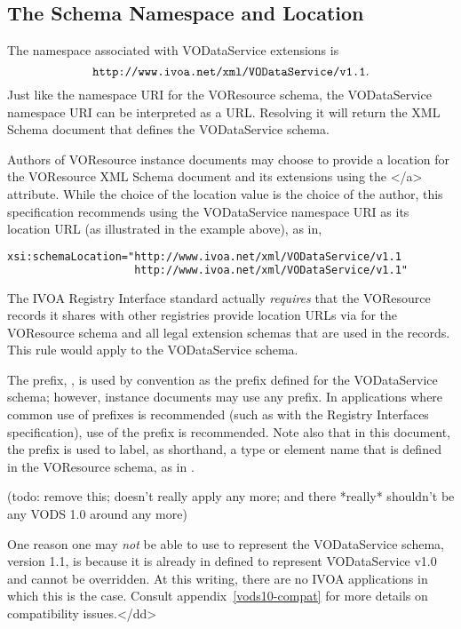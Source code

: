 \documentclass[11pt,a4paper]{ivoa}
\begin{document}
\subsection{The Schema Namespace and Location}


The namespace associated with VODataService extensions is
$$\mbox{\texttt{http://www.ivoa.net/xml/VODataService/v1.1}}.$$
Just like the namespace URI for the VOResource schema, the
VODataService namespace URI can be interpreted as a URL.  Resolving it
will return the XML Schema document 
that defines the VODataService schema.



Authors of VOResource instance documents may choose to
provide a location for the VOResource XML Schema document and its
extensions using the
</a> attribute.  While the choice of
the location value is the choice of the author, this specification
recommends using the VODataService namespace URI as its location URL
(as illustrated in the example above), as in,

\begin{lstlisting}[language=XML]
xsi:schemaLocation="http://www.ivoa.net/xml/VODataService/v1.1
                    http://www.ivoa.net/xml/VODataService/v1.1"
\end{lstlisting}


\begin{admonition}
The IVOA Registry Interface standard \citep{RI}
       actually \emph{requires} that the VOResource records it
       shares with other registries provide location URLs via
        for the VOResource schema and
       all legal extension schemas that are used in the records.  This
       rule would apply to the VODataService schema.
\end{admonition}


The prefix, , is used by convention as the prefix
defined for the VODataService schema; however, instance documents may
use any prefix.  In applications where common use of prefixes is
recommended (such as with the Registry Interfaces specification),
use of the  prefix is recommended.
Note also that in this document, the  prefix is used to
label, as shorthand, a type or element name that is defined in the
VOResource schema, as in .



\begin{admonition}
(todo: remove this; doesn't really apply any more; and there *really*
shouldn't be any VODS 1.0 around any more)

One reason one may \emph{not} be able to use 
       to represent the VODataService schema, version 1.1, is because
       it is already in defined to represent VODataService v1.0 and
       cannot be overridden.  At this writing, there are no IVOA
       applications in which this is the case.  Consult
       appendix~\ref{vods10-compat} for more details on
       compatibility issues.</dd>
\end{admonition}
\end{document}
